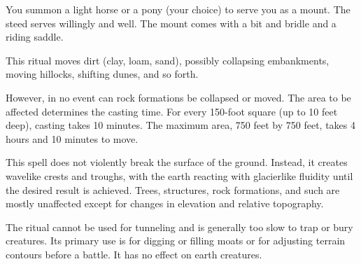 \spellrng{\rngclose}
\begin{spelleffect}
You summon a light horse or a pony (your choice) to serve you as a mount. The steed serves willingly and well. The mount comes with a bit and bridle and a riding saddle.
\end{spelleffect}

\spellrng{\rnglong}
\begin{spelleffect}
This ritual moves dirt (clay, loam, sand), possibly collapsing embankments, moving hillocks, shifting dunes, and so forth.
\par However, in no event can rock formations be collapsed or moved. The area to be affected determines the casting time. For every 150-foot square (up to 10 feet deep), casting takes 10 minutes. The maximum area, 750 feet by 750 feet, takes 4 hours and 10 minutes to move.
\par This spell does not violently break the surface of the ground. Instead, it creates wavelike crests and troughs, with the earth reacting with glacierlike fluidity until the desired result is achieved. Trees, structures, rock formations, and such are mostly unaffected except for changes in elevation and relative topography.
\end{spelleffect}
\begin{spellnotes}
The ritual cannot be used for tunneling and is generally too slow to trap or bury creatures. Its primary use is for digging or filling moats or for adjusting terrain contours before a battle. It has no effect on earth creatures.
\end{spellnotes}

